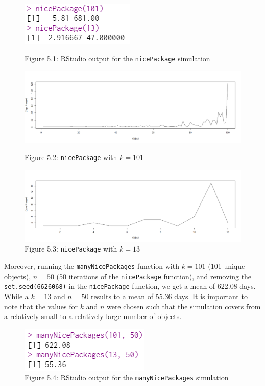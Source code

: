 \documentclass[12pt,letterpaper]{article}
\newcommand{\code}[1]{\colorbox{light-gray}{\texttt{#1}}}
\begin{document}
\begin{enumerate}[label=\Alph*]
\begin{figure}[H]
          \includegraphics[scale=0.7]{nicePackage.png}
          \caption*{\footnotesize Figure 5.1: RStudio output for the \code{nicePackage} simulation}
          \includegraphics*[scale=0.4]{fig5.1.png}
          \caption*{\footnotesize Figure 5.2: \code{nicePackage} with $k=101$}

          \includegraphics*[scale=0.4]{fig5.2.png}
          \caption*{\footnotesize Figure 5.3: \code{nicePackage} with $k=13$}
          
        \end{figure}

        Moreover, running the \code{manyNicePackages} function with $k=101$ (101 unique objects), $n=50$ (50 iterations of the \code{nicePackage} function), and removing the \code{set.seed(6626068)} in the \code{nicePackage} function, we get a mean of 622.08 days. While a $k=13$ and $n=50$ results to a mean of 55.36 days. It is important to note that the values for $k$ and $n$ were chosen such that the simulation covers from a relatively small to a relatively large number of objects.
        \vspace*{0.8cm}
        \begin{figure}[h]
          \centering
          \includegraphics[scale=0.7]{manyNicePackage.png}
          \caption*{\footnotesize Figure 5.4: RStudio output for the \code{manyNicePackages} simulation}
        \end{figure}

    \end{enumerate}
    
    
\end{document}
